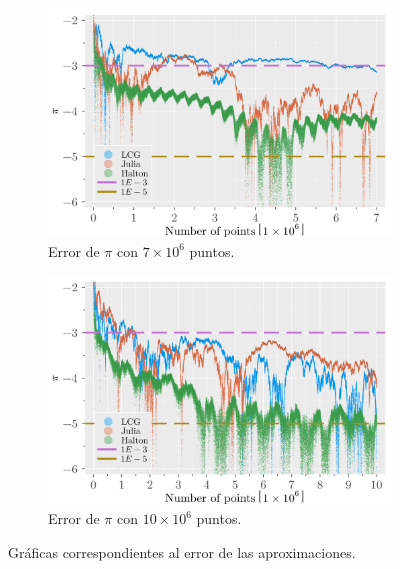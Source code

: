 \begin{enumerate}
\begin{solution}
\begin{figure}
\begin{subfigure}{0.45\textwidth}
                \includegraphics[scale=0.065]{../figures/error_7E6.png}
                \caption{Error de $\pi$ con $7 \times 10^6$ puntos.}
            \end{subfigure}
            \hfill
            \begin{subfigure}{0.45\textwidth}
                \centering
                \includegraphics[scale=0.065]{../figures/error_10E6.png}
                \caption{Error de $\pi$ con $10 \times 10^6$ puntos.}
            \end{subfigure}
            \caption{Gráficas correspondientes al error de las aproximaciones.}
            \label{fig:pi_errors}
        \end{figure}

    \end{solution}
\end{enumerate}

